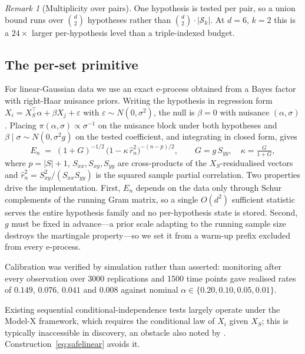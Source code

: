 \documentclass[11pt,a4paper]{article}
\theoremstyle{definition}
\theoremstyle{remark}
\newtheorem{remark}[theorem]{Remark}
\newcommand{\Scal}{\mathcal{S}}
\begin{document}
\begin{remark}[Multiplicity over pairs]
One hypothesis is tested per pair, so a union bound runs over $\binom{d}{2}$
hypotheses rather than $\binom{d}{2} \cdot |\Scal_k|$. At $d = 6$, $k = 2$ this
is a $24\times$ larger per-hypothesis level than a triple-indexed budget.
\end{remark}

\subsection{The per-set primitive}
\label{sec:primitive}

For linear-Gaussian data we use an exact e-process obtained from a Bayes factor
with right-Haar nuisance priors. Writing the hypothesis in regression form
$X_i = X_S^\top \alpha + \beta X_j + \varepsilon$ with
$\varepsilon \sim N(0,\sigma^2)$, the null is $\beta = 0$ with nuisance
$(\alpha,\sigma)$. Placing $\pi(\alpha,\sigma) \propto \sigma^{-1}$ on the
nuisance block under both hypotheses and $\beta \mid \sigma \sim N(0,\sigma^2 g)$
on the tested coefficient, and integrating in closed form, gives
\begin{equation}
\label{eq:safelinear}
E_n \;=\; (1+G)^{-1/2}\,\bigl(1 - \kappa\,\hat r_n^2\bigr)^{-(n-p)/2},
\qquad
G = g\,S_{yy}, \quad \kappa = \tfrac{G}{1+G},
\end{equation}
where $p = |S| + 1$, $S_{xx},S_{xy},S_{yy}$ are cross-products of the
$X_S$-residualised vectors and $\hat r_n^2 = S_{xy}^2/(S_{xx}S_{yy})$ is the
squared sample partial correlation. Two properties drive the implementation.
First, $E_n$ depends on the data only through Schur complements of the running
Gram matrix, so a single $O(d^2)$ sufficient statistic serves the entire
hypothesis family and no per-hypothesis state is stored. Second, $g$ must be
fixed in advance---a prior scale adapting to the running sample size destroys
the martingale property---so we set it from a warm-up prefix excluded from every
e-process.

Calibration was verified by simulation rather than asserted: monitoring after
every observation over 3000 replications and 1500 time points gave realised
rates of $0.149$, $0.076$, $0.041$ and $0.008$ against nominal
$\alpha \in \{0.20, 0.10, 0.05, 0.01\}$.

Existing sequential conditional-independence tests largely operate under the
Model-X framework, which requires the conditional law of $X_i$ given $X_S$;
this is typically inaccessible in discovery, an obstacle also noted by
\citet{csillag2025prediction}. Construction~\eqref{eq:safelinear} avoids it.
\end{document}
